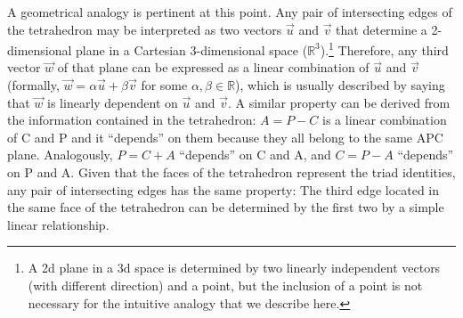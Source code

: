 \documentclass[12pt,oneside,a4paper]{article} %
\newcommand\vt[1]{\textcolor{rd}{#1}}
\begin{document}



A geometrical analogy is pertinent at this point. Any pair of intersecting edges
of the tetrahedron may be interpreted as two vectors $\vec{u}$ and $\vec{v}$
that determine a 2-dimensional plane in a Cartesian 3-dimensional
space ($\mathbb{R}^3$).\footnote{A 2d plane in a 3d space is determined by two linearly independent
vectors (with different direction) and a point, but the inclusion of a point is not
necessary for the intuitive analogy that we describe here.} Therefore, any third
vector $\vec{w}$ of that plane can be expressed as a linear combination of
$\vec{u}$ and $\vec{v}$ (formally, $\vec{w}=\alpha\vec{u}+\beta\vec{v}$ for some $\alpha, \beta \in \mathbb{R}$), which is usually
described by saying that $\vec{w}$ is linearly dependent on $\vec{u}$ and
$\vec{v}$.
A similar property can be derived from the information contained in the
tetrahedron: $A=P-C$ is a linear combination of C and P and it ``depends''
on them because they all belong to the same APC plane. Analogously, $P=C+A$
``depends'' on C and A, and $C=P-A$ ``depends'' on P and A. Given that the faces of the tetrahedron represent the triad identities, any pair of intersecting edges has the same property: The third edge located in the same face of the tetrahedron can be determined by the first two by a simple linear relationship.
\end{document}
